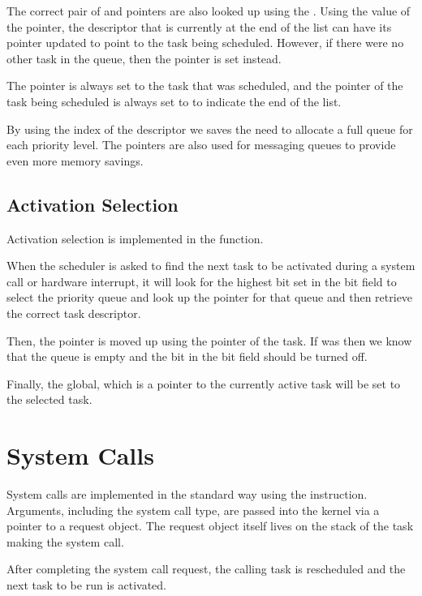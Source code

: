 \documentclass[pdftex,10pt,a4paper]{article}
\begin{document}
The correct pair of  and  pointers are also looked
up using the . Using the value of the 
pointer, the descriptor that is currently at the end of the list can
have its  pointer updated to point to the task being
scheduled. However, if there were no other task in the queue, then
the  pointer is set instead.

The  pointer is always set to the task that was scheduled,
and the  pointer of the task being scheduled is always set
to  to indicate the end of the list.

By using the  index of the descriptor we saves the need to
allocate a full queue for each priority level. The  pointers
are also used for messaging queues to provide even more memory
savings.

\subsection*{Activation Selection}

Activation selection is implemented in the 
function.

When the scheduler is asked to find the next task to be activated
during a system call or hardware interrupt, it will look for the
highest bit set in the bit field to select the priority queue and look
up the  pointer for that queue and then retrieve the correct
task descriptor.

Then, the  pointer is moved up using the  pointer
of the  task. If  was  then we know that
the queue is empty and the bit in the bit field should be turned off.

Finally, the  global, which is a pointer to the
currently active task will be set to the selected task.

\section*{System Calls}

System calls are implemented in the standard way using the 
instruction. Arguments, including the system call type, are passed
into the kernel via a pointer to a request object. The request object
itself lives on the stack of the task making the system call.

After completing the system call request, the calling task is
rescheduled and the next task to be run is activated.
\end{document}
